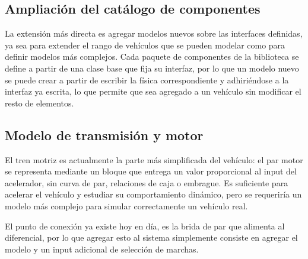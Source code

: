 \subsection{Ampliación del catálogo de componentes}

La extensión más directa es agregar modelos nuevos sobre las interfaces definidas, ya sea para extender el rango de vehículos que se pueden modelar como para definir modelos más complejos. Cada paquete de componentes de la biblioteca se define a partir de una clase base que fija su interfaz, por lo que un modelo nuevo se puede crear a partir de escribir la física correspondiente y adhiriéndose a la interfaz ya escrita, lo que permite que sea agregado a un vehículo sin modificar el resto de elementos.



\subsection{Modelo de transmisión y motor}

El tren motriz es actualmente la parte más simplificada del vehículo: el par motor se representa mediante un bloque que entrega un valor proporcional al input del acelerador, sin curva de par, relaciones de caja o embrague. Es suficiente para acelerar el vehículo y estudiar su comportamiento dinámico, pero se requeriría un modelo más complejo para simular correctamente un vehículo real.

El punto de conexión ya existe hoy en día, es la brida de par que alimenta al diferencial, por lo que agregar esto al sistema simplemente consiste en agregar el modelo y un input adicional de selección de marchas.


